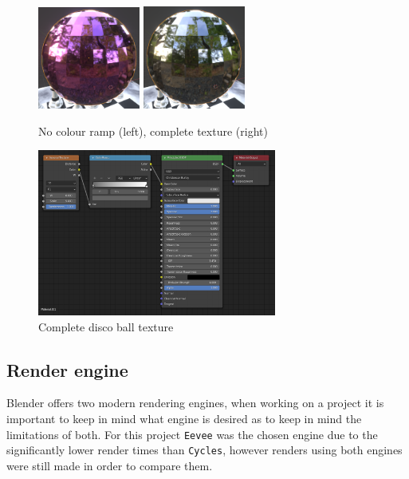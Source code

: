 \documentclass[11pt]{article}
\begin{document}
\begin{figure}[htbp]
\begin{center}
\includegraphics[width=0.3\textwidth]{Images/Purple.png}
\includegraphics[width=0.3\textwidth]{Images/discoclose.png}
\end{center}
\caption{No colour ramp (left), complete texture (right)}
\end{figure}

\begin{figure}[htbp]
\centering
\includegraphics[width=0.7\textwidth]{Images/discoball_texture.png}
\caption{Complete disco ball texture}
\end{figure}
\newpage
\subsection{Render engine}
\label{sec:orga5962b9}
Blender offers two modern rendering engines, when working on a project it is
important to keep in mind what engine is desired as to keep in mind the
limitations of both. For this project \texttt{Eevee} was the chosen engine due to the
significantly lower render times than \texttt{Cycles}, however renders using both
engines were still made in order to compare them.\\
\end{document}
